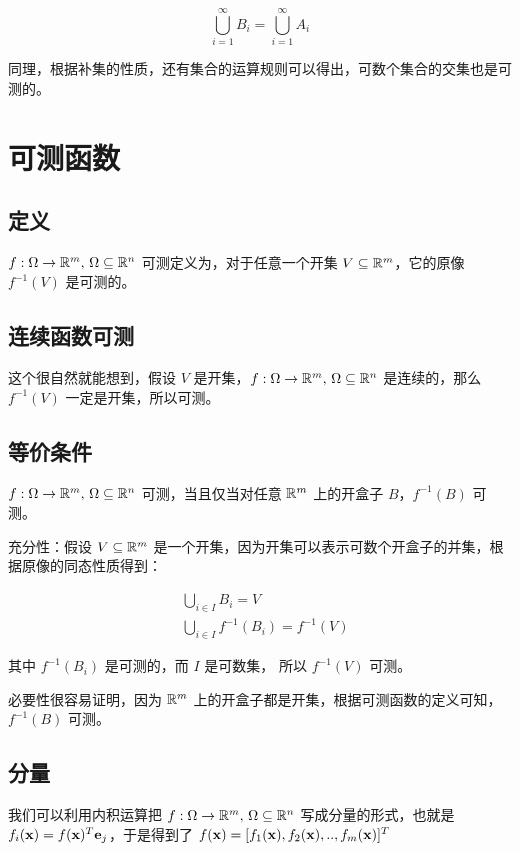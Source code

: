 \[
\bigcup_{i=1}^{\infty}B_i = \bigcup_{i=1}^{\infty}A_i
\]

同理，根据补集的性质，还有集合的运算规则可以得出，可数个集合的交集也是可测的。

\renewcommand{\f}{f: \Omega \to \R^m,\, \Omega \subseteq \R^n }
\section{可测函数}

\subsection{定义}

$\f$ 可测定义为，对于任意一个开集 $V \subseteq \mathbb{R}^m$，它的原像 $f^{-1}(V)$ 是可测的。

\subsection{连续函数可测}

这个很自然就能想到，假设 $V$ 是开集，$\f$ 是连续的，那么 $f^{-1}(V)$ 一定是开集，所以可测。

\subsection{等价条件}

$\f$ 可测，当且仅当对任意 $\mathbb{R}^m$ 上的开盒子 $B$，$f^{-1}(B)$ 可测。

充分性：假设 $V \subseteq \mathbb{R}^m$ 是一个开集，因为开集可以表示可数个开盒子的并集，根据原像的同态性质得到：

\begin{align*}
& \bigcup_{i \in I}B_i = V \\
& \bigcup_{i \in I}f^{-1}(B_i) = f^{-1}(V)
\end{align*}

其中 $f^{-1}(B_i)$ 是可测的，而 $I$ 是可数集， 所以 $f^{-1}(V)$ 可测。 

必要性很容易证明，因为 $\mathbb{R}^m$  上的开盒子都是开集，根据可测函数的定义可知， $f^{-1}(B)$ 可测。


\subsection{分量}

我们可以利用内积运算把 $\f$ 写成分量的形式，也就是 $f_i(\mathbf{x}) = f(\mathbf{x})^T \mathbf{e}_j$，于是得到了 
$f(\mathbf{x}) = [f_1(\mathbf{x}), f_2(\mathbf{x}), .., f_m(\mathbf{x})]^T $

